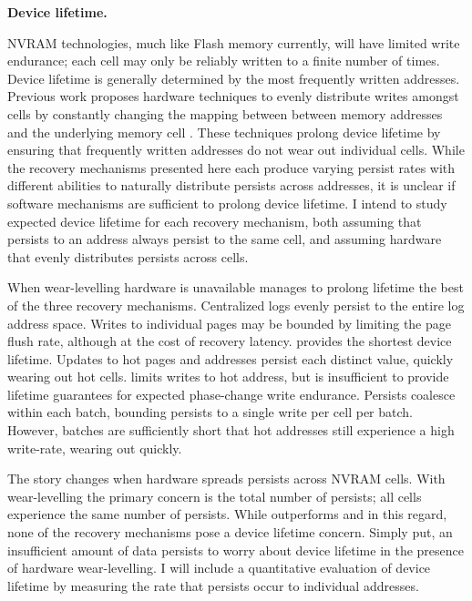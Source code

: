 \textbf{Device lifetime.}

NVRAM technologies, much like Flash memory currently, will have limited write endurance; each cell may only be reliably written to a finite number of times.
Device lifetime is generally determined by the most frequently written addresses.
Previous work proposes hardware techniques to evenly distribute writes amongst cells by constantly changing the mapping between between memory addresses and the underlying memory cell \cite{QureshiKaridis09}.
These techniques prolong device lifetime by ensuring that frequently written addresses do not wear out individual cells.
While the recovery mechanisms presented here each produce varying persist rates with different abilities to naturally distribute persists across addresses, it is unclear if software mechanisms are sufficient to prolong device lifetime.
I intend to study expected device lifetime for each recovery mechanism, both assuming that persists to an address always persist to the same cell, and assuming hardware that evenly distributes persists across cells.

When wear-levelling hardware is unavailable \NVDisk manages to prolong lifetime the best of the three recovery mechanisms.
Centralized logs evenly persist to the entire log address space.
Writes to individual pages may be bounded by limiting the page flush rate, although at the cost of recovery latency.
\InPlace provides the shortest device lifetime.
Updates to hot pages and addresses persist each distinct value, quickly wearing out hot cells.
\GroupCommit limits writes to hot address, but is insufficient to provide lifetime guarantees for expected phase-change write endurance.
Persists coalesce within each batch, bounding persists to a single write per cell per batch.
However, batches are sufficiently short that hot addresses still experience a high write-rate, wearing out quickly.

The story changes when hardware spreads persists across NVRAM cells.
With wear-levelling the primary concern is the total number of persists; all cells experience the same number of persists.
While \GroupCommit outperforms \NVDisk and \InPlace in this regard, none of the recovery mechanisms pose a device lifetime concern.
Simply put, an insufficient amount of data persists to worry about device lifetime in the presence of hardware wear-levelling.
I will include a quantitative evaluation of device lifetime by measuring the rate that persists occur to individual addresses.




